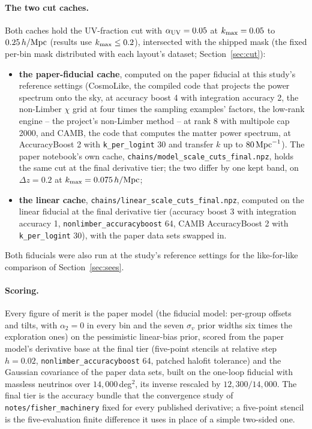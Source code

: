 \documentclass[11pt]{article}
\newcommand{\kmax}{k_{\rm max}}
\newcommand{\hMpc}{\,h/{\rm Mpc}}
\newcommand{\auv}{\alpha_{\rm UV}}
\newcommand{\us}{\_\allowbreak}
\begin{document}
\paragraph{The two cut caches.}
Both caches hold the UV-fraction cut with $\auv = 0.05$ at
$\kmax = 0.05$ to $0.25\hMpc$ (results use $\kmax \le 0.2$),
intersected with the shipped mask (the fixed per-bin mask distributed
with each layout's dataset; Section~\ref{sec:cut}):
\begin{itemize}
  \item \textbf{the paper-fiducial cache}, computed on the paper
    fiducial at this study's reference settings (CosmoLike, the
    compiled code that projects the power spectrum onto the sky, at
    accuracy
    boost 4 with integration accuracy 2, the non-Limber $\chi$ grid at
    four times the sampling examples' factors, the low-rank engine --
    the project's non-Limber method -- at rank 8 with
    multipole cap 2000, and CAMB, the code that computes the matter
    power spectrum, at AccuracyBoost 2 with
    \texttt{k\_per\_logint} 30 and transfer $k$ up to
    $80\,{\rm Mpc}^{-1}$).  The paper notebook's own cache,
    \texttt{chains/model\us scale\us cuts\us final.npz}, holds the
    same cut at the final derivative tier; the two differ by one kept
    band, on $\Delta z = 0.2$ at $\kmax = 0.075\hMpc$;
  \item \textbf{the linear cache},
    \texttt{chains/linear\us scale\us cuts\us final.npz},
    computed on the linear fiducial at the final derivative tier
    (accuracy boost 3 with integration accuracy 1,
    \texttt{nonlimber\us accuracyboost} 64, CAMB AccuracyBoost 2 with
    \texttt{k\_per\_logint} 30), with the paper data sets swapped in.
\end{itemize}
Both fiducials were also run at the study's reference settings for
the like-for-like comparison of Section~\ref{sec:sees}.

\paragraph{Scoring.}
Every figure of merit is the paper model (the fiducial model:
per-group offsets and tilts, with
$\alpha_2 = 0$ in every bin and the seven $\sigma_v$ prior widths six
times the exploration ones) on the pessimistic linear-bias prior,
scored from the paper model's derivative base at the final tier
(five-point stencils at relative step $h = 0.02$,
\texttt{nonlimber\us accuracyboost} 64, patched halofit tolerance)
and the Gaussian covariance of the paper data sets, built on the
one-loop fiducial with massless neutrinos over $14{,}000$\,deg$^2$,
its inverse rescaled by $12{,}300/14{,}000$.  The final tier is the
accuracy bundle that the convergence study of
\texttt{notes/fisher\us machinery} fixed for every published
derivative; a five-point stencil is the five-evaluation finite
difference it uses in place of a simple two-sided one.
\end{document}
